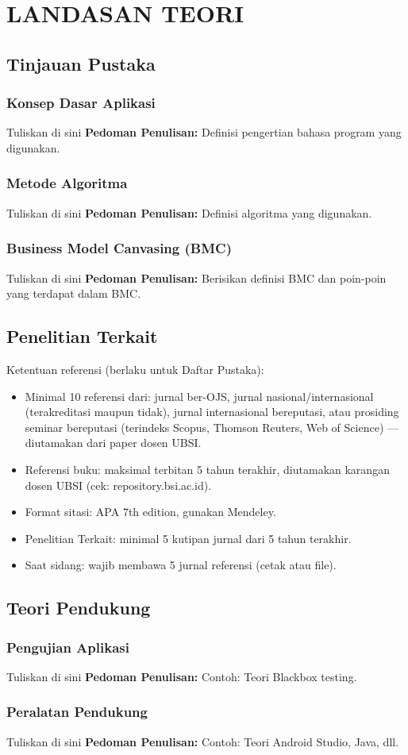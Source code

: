 \chapter{LANDASAN TEORI}
\section{Tinjauan Pustaka}
\subsection{Konsep Dasar Aplikasi}


Tuliskan di sini \textbf{Pedoman Penulisan:} Definisi pengertian bahasa program yang digunakan.


\subsection{Metode Algoritma}


Tuliskan di sini \textbf{Pedoman Penulisan:} Definisi algoritma yang digunakan.


\subsection{Business Model Canvasing (BMC)}


Tuliskan di sini \textbf{Pedoman Penulisan:} Berisikan definisi BMC dan poin-poin yang terdapat dalam BMC.


\section{Penelitian Terkait}

Ketentuan referensi (berlaku untuk Daftar Pustaka):
\begin{itemize}
    \item Minimal 10 referensi dari: jurnal ber-OJS, jurnal nasional/internasional (terakreditasi maupun tidak), jurnal internasional bereputasi, atau prosiding seminar bereputasi (terindeks Scopus, Thomson Reuters, Web of Science) --- diutamakan dari paper dosen UBSI.
    \item Referensi buku: maksimal terbitan 5 tahun terakhir, diutamakan karangan dosen UBSI (cek: repository.bsi.ac.id).
    \item Format sitasi: APA 7th edition, gunakan Mendeley.
    \item Penelitian Terkait: minimal 5 kutipan jurnal dari 5 tahun terakhir.
    \item Saat sidang: wajib membawa 5 jurnal referensi (cetak atau file).
\end{itemize}


\section{Teori Pendukung}
\subsection{Pengujian Aplikasi}


Tuliskan di sini \textbf{Pedoman Penulisan:} Contoh: Teori Blackbox testing.


\subsection{Peralatan Pendukung}


Tuliskan di sini \textbf{Pedoman Penulisan:} Contoh: Teori Android Studio, Java, dll.



